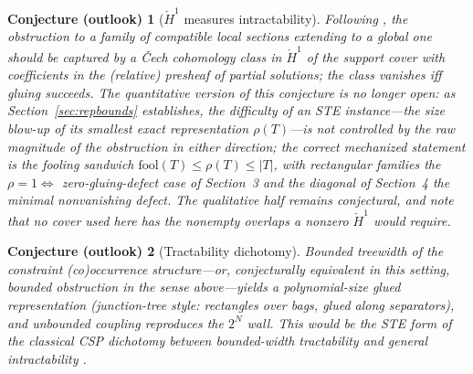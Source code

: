 \documentclass[11pt]{article}
\newtheorem*{conjecture}{Conjecture (outlook)}
\begin{document}
\begin{conjecture}[$\check{H}^1$ measures intractability]
Following \citet{abramsky2012cohomology}, the obstruction to a family of
compatible local sections extending to a global one should be captured
by a \v{C}ech cohomology class in $\check{H}^1$ of the support cover
with coefficients in the (relative) presheaf of partial solutions; the
class vanishes iff gluing succeeds.  \emph{The quantitative version of
this conjecture is no longer open}: as Section~\ref{sec:repbounds}
establishes, the difficulty of an STE instance---the size blow-up of its
smallest exact representation $\rho(T)$---is \emph{not} controlled by the
raw magnitude of the obstruction in either direction; the correct
mechanized statement is the fooling sandwich
$\mathrm{fool}(T) \le \rho(T) \le |T|$, with rectangular families the
$\rho = 1 \Leftrightarrow$ zero-gluing-defect case of Section~3 and the
diagonal of Section~4 the minimal nonvanishing defect.  The qualitative
half remains conjectural, and note that no cover used here has the
nonempty overlaps a nonzero $\check{H}^1$ would require.
\end{conjecture}

\begin{conjecture}[Tractability dichotomy]
Bounded treewidth of the constraint (co)occurrence structure---or,
conjecturally equivalent in this setting, bounded obstruction in the
sense above---yields a polynomial-size glued representation
(junction-tree style: rectangles over bags, glued along separators),
and unbounded coupling reproduces the $2^N$ wall.  This would be the
STE form of the classical CSP dichotomy between bounded-width
tractability and general intractability
\citep{dechter2003constraint}.
\end{conjecture}
\end{document}
